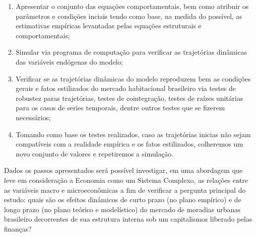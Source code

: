 \begin{enumerate}
	\item Apresentar o conjunto das equações comportamentais, bem como atribuir os parâmetros e condições inciais tendo como base, na medida do possível, as estimativas empíricas levantadas pelas equações estruturais e comportamentais;
	
	\item Simular via programa de computação para verificar as trajetórias dinâmicas das variáveis endógenas do modelo;
	
	\item Verificar se as trajetórias dinâmicas do modelo reproduzem bem as condições gerais e fatos estilizados do mercado habitacional brasileiro via testes de robustez paras trajetórias, testes de cointegração, testes de raízes unitárias para os casos de series temporais, dentre outros testes que se fizerem necessários;
	
	\item Tomando como base os testes realizados, caso as trajetórias inicias não sejam compatíveis com a realidade empírica e os fatos estilizados, colheremos um novo conjunto de valores e repetiremos a simulação.
	
\end{enumerate}

Dados os passos apresentados será possível investigar, em uma abordagem que leve em consideração a Economia como um Sistema Complexo, as relações entre as variáveis macro e microeconômicas a fim de verificar a pergunta principal do estudo: quais são os efeitos dinâmicos de curto prazo (no plano empírico) e de longo prazo (no plano teórico e modelístico) do mercado de moradias urbanas brasileiro decorrentes de sua estrutura interna sob um capitalismos liberado pelas finanças?